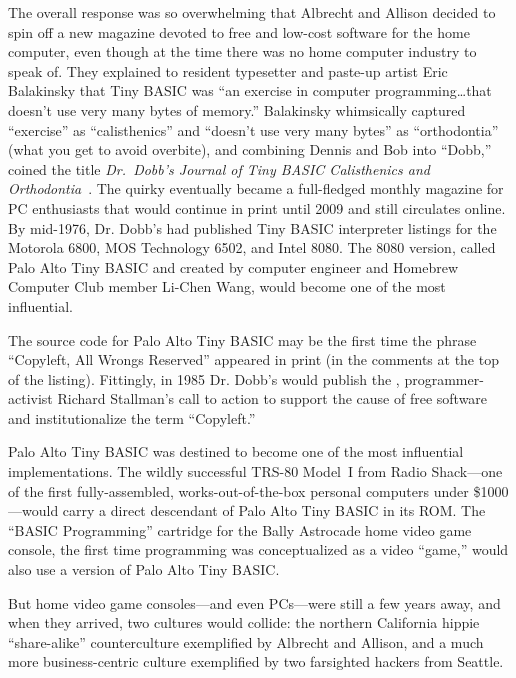 The overall response was so overwhelming that Albrecht and Allison
decided to spin off a new magazine devoted to free and low-cost software
for the home computer, even though at the time there was no home
computer industry to speak of.
They explained to resident typesetter
and paste-up artist Eric Balakinsky that Tiny BASIC was ``an exercise in
computer programming\ldots{}that doesn't use very many bytes of
memory.''
Balakinsky whimsically captured ``exercise'' as
``calisthenics'' and ``doesn't use very many bytes'' as ``orthodontia''
(what you get to avoid overbite), and combining Dennis and Bob into
``Dobb,'' coined the title \emph{Dr.~Dobb's Journal of Tiny BASIC
Calisthenics and Orthodontia}~\cite[p.~265]{dormouse}.
The quirky  eventually became a
full-fledged monthly magazine for PC enthusiasts that
would continue in print until 2009 and still circulates online.
By mid-1976, Dr. Dobb's had published Tiny BASIC interpreter listings
for the Motorola 6800, MOS Technology 6502, and Intel 8080.
The 8080
version, called Palo Alto Tiny BASIC and created by computer engineer
and Homebrew Computer Club member Li-Chen Wang, would become one of the
most influential.

\begin{tangent}
The source code for Palo Alto Tiny BASIC may be the first time
the phrase ``Copyleft, All Wrongs Reserved'' appeared in print (in the
comments at the top of the listing).
Fittingly, in 1985 Dr. Dobb's would publish the ,
programmer-activist Richard Stallman's call to action to support the
cause of free software and institutionalize the term ``Copyleft.''
\end{tangent}

Palo Alto Tiny BASIC was destined to become one of the most influential
implementations. 
The wildly successful TRS-80 Model~I from Radio Shack---one of the first 
fully-assembled, works-out-of-the-box  
personal computers under \$1000---would carry a direct descendant of
Palo Alto Tiny BASIC in its ROM.
The ``BASIC Programming'' cartridge for the Bally Astrocade
home video game console, the first time programming
was conceptualized as a video ``game,''
would also use a version of Palo Alto Tiny
BASIC.

But home video game consoles---and even PCs---were still a few years
away, and when they arrived, two cultures would collide: the northern
California hippie ``share-alike'' counterculture exemplified by Albrecht
and Allison, and a much more business-centric culture exemplified by
two farsighted hackers from Seattle.




